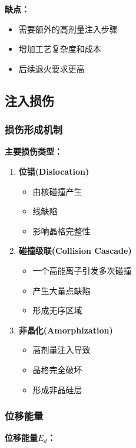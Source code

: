 \documentclass[UTF8,12pt,a4paper]{ctexart}
\begin{document}
\textbf{缺点：}
\begin{itemize}
    \item 需要额外的高剂量注入步骤
    \item 增加工艺复杂度和成本
    \item 后续退火要求更高
\end{itemize}

\subsection{注入损伤}

\subsubsection{损伤形成机制}

\textbf{主要损伤类型：}

\begin{enumerate}
    \item \textbf{位错(Dislocation)}
    \begin{itemize}
        \item 由核碰撞产生
        \item 线缺陷
        \item 影响晶格完整性
    \end{itemize}
    
    \item \textbf{碰撞级联(Collision Cascade)}
    \begin{itemize}
        \item 一个高能离子引发多次碰撞
        \item 产生大量点缺陷
        \item 形成无序区域
    \end{itemize}
    
    \item \textbf{非晶化(Amorphization)}
    \begin{itemize}
        \item 高剂量注入导致
        \item 晶格完全破坏
        \item 形成非晶硅层
    \end{itemize}
\end{enumerate}

\subsubsection{位移能量}

\textbf{位移能量$E_d$：}
\end{document}
